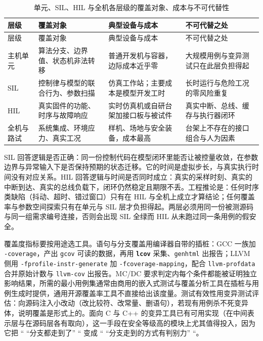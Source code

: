 \documentclass[12pt,a4paper,fontset=fandol]{ctexbook}
\newcommand{\Tp}[1]{\texttt{#1}}
\newcommand{\Lib}[1]{\textbf{\texttt{#1}}}
\newcommand{\Lang}[1]{\textsf{#1}}
\begin{document}
\begin{longtable}{>{\raggedright\arraybackslash}p{}>{\raggedright\arraybackslash}p{}>{\raggedright\arraybackslash}p{}>{\raggedright\arraybackslash}p{}}
\caption{单元、SIL、HIL 与全机各层级的覆盖对象、成本与不可代替性}\label{tab:ch14-tiers}\\
\toprule
层级 & 覆盖对象 & 典型设备与成本 & 不可代替之处 \\
\midrule
\endfirsthead
\toprule
层级 & 覆盖对象 & 典型设备与成本 & 不可代替之处 \\
\midrule
\endhead
\bottomrule
\endfoot
\endlastfoot
主机单元 & 算法分支、边界值、状态机非法转移 & 普通开发机与容器，边际成本近乎零 & 大规模用例与变异测试只在此层负担得起 \\
SIL & 控制律与模型的联合行为、参数扫描 & 仿真工作站；主要成本是模型开发工时 & 长时运行与危险工况的零风险重复 \\
HIL & 真实固件的功能、时序与故障响应 & 实时仿真机或自研台架加接口板与被试件 & 真实中断、总线、缓存与执行器闭环 \\
全机与路试 & 系统集成、环境应力、真实工况 & 样机、场地与安全装备，成本最高 & 台架上不存在的接口组合与人为因素 \\
\end{longtable}

\begin{compare}[title={SIL 与 HIL 的判据边界}]
SIL 回答逻辑是否正确：同一份控制代码在模型闭环里能否让被控量收敛，在参数边界与异常输入下是否保持预期的状态迁移。它的时间是虚拟步长，与真实执行时间没有对应关系。HIL 回答逻辑与时间是否同时成立：真实的采样时刻、真实的中断到达、真实的总线负载下，闭环仍然稳定且期限不丢。工程推论是：任何时序类缺陷（抖动、超时、错过窗口）只有在 HIL 与全机上成立才算结论；任何覆盖率与参数空间探索只有在单元与 SIL 层才负担得起。两层必须用同一份被测源码与同一组需求编号连接，否则会出现 SIL 全绿而 HIL 从未跑过同一条用例的假安全。
\end{compare}

覆盖度指标要按用途选工具。语句与分支覆盖用编译器自带的插桩：GCC 一族加 \Tp{-coverage}，产出 \Tp{gcov} 可读的数据，再用 \Lib{lcov} 采集、\Tp{genhtml} 出报告；\Lang{LLVM} 侧用 \Tp{-fprofile-instr-generate} 加 \Tp{-fcoverage-mapping}，配合 \Tp{llvm-profdata} 合并原始计数与 \Tp{llvm-cov} 出报告。MC/DC 要求判定内每个条件都能被证明独立影响结果，所需的最小用例集通常由商用的嵌入式测试与覆盖分析工具在插桩与用例生成时提供，通用开源覆盖率工具不直接给出该度量。测试有效性用变异测试评估：向源码注入小改动（改比较符、改常量、删语句），若现有用例杀不死变异体，说明覆盖是形式上的。面向 \Lang{C} 与 \Lang{C++} 的变异工具已有可用实现（在中间表示层与在源码层各有取向），这一手段在安全等级高的模块上尤其值得投入，因为它把 `` ``分支都走到了'' `` 变成 `` ``分支走到的方式有判别力'' ``。
\end{document}
